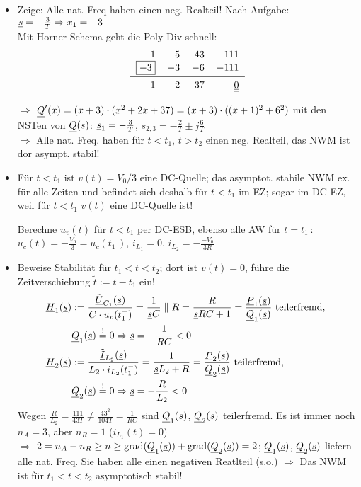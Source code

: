 \begin{itemize}
\item Zeige: Alle nat. Freq haben einen neg. Realteil! Nach Aufgabe:
  $\underline{s}=-\frac{3}{T} \Rightarrow x_1 = -3$\\
  Mit Horner-Schema geht die Poly-Div schnell:\\
  \[\begin{tabular}{rrrr}
    $1$ & $5$ & $43$ & $111$\\
    \fbox{$-3$} & $-3$ & $-6$ & $-111$\\
    \midrule
    $1$ & $2$ & $37$ & \underline{\underline{$0$}}
  \end{tabular}\]

  $\Rightarrow$ $\underline{Q}'(x) = (x+3)\cdot (x^2+2x+37) = (x+3)\cdot ((x+1)^2 + 6^2)$
  mit den NSTen von $\underline{Q}(s)$:
  $\underline{s}_1 = -\frac{3}{T}$, $s_{2,3}=-\frac{2}{T}\pm j\frac{6}{T}$\\
  $\Rightarrow$ Alle nat. Freq. haben für $t<t_1$, $t>t_2$ einen neg. Realteil,
  das NWM ist dor asympt. stabil!

\item Für $t<t_1$ ist $v(t)=V_0/3$ eine DC-Quelle; das asymptot. stabile NWM
  ex. für alle Zeiten und befindet sich deshalb für $t<t_1$ im EZ;
  sogar im DC-EZ, weil für $t<t_1$ $v(t)$ eine DC-Quelle ist!

  Berechne $u_v(t)$ für $t<t_1$ per DC-ESB, ebenso alle AW für $t=t_1^-$:
  $u_c(t) = -\frac{V_0}{3}=u_c(t_1^-)$, $i_{L_1} = 0$, $i_{L_2} = -\frac{-V_0}{3R}$

\item Beweise Stabilität für $t_1 < t < t_2$; dort ist $v(t)=0$, führe die
  Zeitverschiebung $\tilde t:= t-t_1$ ein!
  \begin{align*}
    \underline{H}_1(\underline{s}) &:= \frac{\tilde{\underline{U}}_{C_1}(\underline{s})}{C\cdot u_v(t_1^-)}
    = \frac{1}{\underline{s}C}\parallel R
    = \frac{R}{\underline{s}RC+1} = \frac{\underline{P}_1(\underline{s})}{\underline{Q}_1(\underline{s})} \text{ teilerfremd, }\\
    &\underline{Q}_1(\underline{s})\stackrel{!}{=}0
    \Rightarrow \underline{s}=-\frac{1}{RC}<0\\
    \underline{H}_2(\underline{s}) &:= \frac{\tilde{\underline{I}}_{L_2}(\underline{s})}{L_2\cdot i_{L_2}(t_1^-)}
    = \frac{1}{\underline{s}L_2+R}
    = \frac{\underline{P}_2(\underline{s})}{\underline{Q}_2(\underline{s})} \text{ teilerfremd, }\\
    &\underline{Q}_2(\underline{s})\stackrel{!}{=}0
    \Rightarrow \underline{s}=-\frac{R}{L_2}<0
  \end{align*}
  Wegen $\frac{R}{L_2}=\frac{111}{43T} \neq \frac{43^2}{104T} = \frac{1}{RC}$
  sind $\underline{Q}_1(\underline{s})$, $\underline{Q}_2(\underline{s})$ teilerfremd.
  Es ist immer noch $n_A=3$, aber $n_R=1$ ($i_{L_1}(t) = 0$)\\
  $\Rightarrow$ $2=n_A-n_R\geq n \geq \operatorname{grad}(\underline{Q}_1(\underline{s}))+\operatorname{grad}(\underline{Q}_2(\underline{s}))=2$;
  $\underline{Q}_1(\underline{s})$, $\underline{Q}_2(\underline{s})$ liefern alle nat. Freq.
  Sie haben alle einen negativen Reatlteil (s.o.)
  $\Rightarrow$ Das NWM ist für $t_1<t<t_2$ asymptotisch stabil!
\end{itemize}
